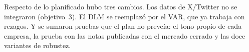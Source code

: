 Respecto de lo planificado hubo tres cambios. Los datos de X/Twitter no se integraron
(objetivo~3). El DLM se reemplazó por el VAR, que ya trabaja con rezagos. Y se sumaron
pruebas que el plan no preveía: el tono propio de cada empresa, la prueba con las notas
publicadas con el mercado cerrado y las doce variantes de robustez.
